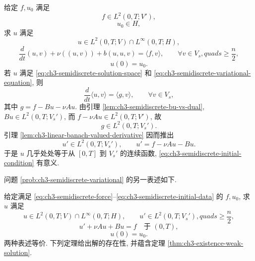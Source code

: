 \MBProblemHeading
\label{prob:ch3-semidiscrete-variational}
给定 $f,u_0$ 满足
\begin{equation}
f\in L^2(0,T;V'),
\label{eq:ch3-semidiscrete-force}
\end{equation}
\begin{equation}
u_0\in H,
\label{eq:ch3-semidiscrete-initial-data}
\end{equation}
求 $u$ 满足
\begin{equation}
u\in L^2(0,T;V)\cap L^\infty(0,T;H),
\label{eq:ch3-semidiscrete-solution-space}
\end{equation}
\begin{equation}
\frac d{dt}(u,v)+\nu((u,v))+b(u,u,v)=\langle f,v\rangle,
\qquad\forall v\in V_s,quad s\geq\frac n2,
\label{eq:ch3-semidiscrete-variational-equation}
\end{equation}
\begin{equation}
u(0)=u_0.
\label{eq:ch3-semidiscrete-initial-condition}
\end{equation}
若 $u$ 满足 \eqref{eq:ch3-semidiscrete-solution-space} 和 \eqref{eq:ch3-semidiscrete-variational-equation}, 则
\[
\frac d{dt}\langle u,v\rangle=\langle g,v\rangle,
\qquad\forall v\in V_s,
\]
其中 $g=f-Bu-\nu Au$. 由引理 \ref{lem:ch3-semidiscrete-bu-vs-dual}, $Bu\in L^2(0,T;V_s')$, 而 $f-\nu Au\in L^2(0,T;V')$, 故
\begin{equation}
g\in L^2(0,T;V_s').
\label{eq:ch3-semidiscrete-g-space}
\end{equation}
引理 \ref{lem:ch3-linear-banach-valued-derivative} 因而推出
\begin{equation}
u'\in L^2(0,T;V_s'),
\qquad u'=f-\nu Au-Bu.
\label{eq:ch3-semidiscrete-time-derivative}
\end{equation}
于是 $u$ 几乎处处等于从 $[0,T]$ 到 $V_s'$ 的连续函数, \eqref{eq:ch3-semidiscrete-initial-condition} 有意义.

问题 \ref{prob:ch3-semidiscrete-variational} 的另一表述如下.

\MBProblemHeading
\label{prob:ch3-semidiscrete-operator}
给定满足 \eqref{eq:ch3-semidiscrete-force}--\eqref{eq:ch3-semidiscrete-initial-data} 的 $f,u_0$, 求 $u$ 满足
\begin{equation}
u\in L^2(0,T;V)\cap L^\infty(0,T;H),
\qquad u'\in L^2(0,T;V_s'),quad s\geq\frac n2,
\label{eq:ch3-semidiscrete-operator-space}
\end{equation}
\begin{equation}
u'+\nu Au+Bu=f\quad\text{于 }(0,T),
\label{eq:ch3-semidiscrete-operator-equation}
\end{equation}
\begin{equation}
u(0)=u_0.
\label{eq:ch3-semidiscrete-operator-initial}
\end{equation}
两种表述等价. 下列定理给出解的存在性, 并蕴含定理 \ref{thm:ch3-existence-weak-solution}.

